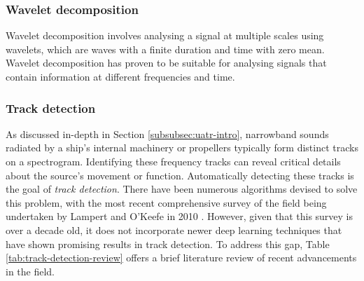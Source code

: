 \subsubsection{Wavelet decomposition}
Wavelet decomposition involves analysing a signal at multiple scales using wavelets, which are waves with a finite duration and time with zero mean. Wavelet decomposition has proven to be suitable for analysing signals that contain information at different frequencies and time.

\subsubsection{Track detection}

As discussed in-depth in Section \ref{subsubsec:uatr-intro}, narrowband sounds radiated by a ship's internal machinery or propellers typically form distinct tracks on a spectrogram. Identifying these frequency tracks can reveal critical details about the source's movement or function. Automatically detecting these tracks is the goal of \textit{track detection}. There have been numerous algorithms devised to solve this problem, with the most recent comprehensive survey of the field being undertaken by Lampert and O'Keefe in 2010 \cite{lampert_survey_2010}. However, given that this survey is over a decade old, it does not incorporate newer deep learning techniques that have shown promising results in track detection. To address this gap, Table \ref{tab:track-detection-review} offers a brief literature review of recent advancements in the field.

